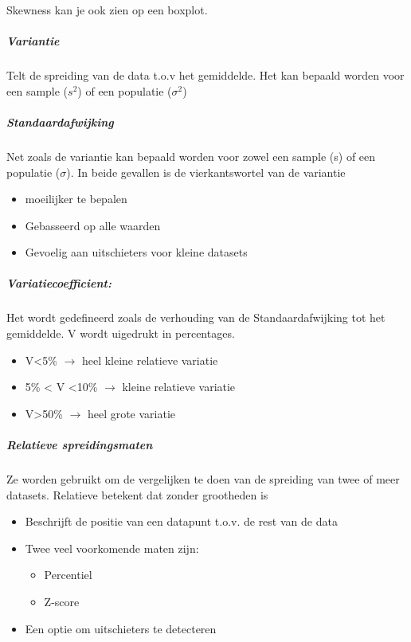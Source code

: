 \documentclass[12pt]{article}
\begin{document}
Skewness kan je ook zien op een boxplot.
\subparagraph{Variantie}
Telt de spreiding van de data t.o.v het gemiddelde. Het kan bepaald worden voor een sample ($s^2$) of een populatie ($\sigma^2$)
\subparagraph{Standaardafwijking}
Net zoals de variantie kan bepaald worden voor zowel een sample
(s) of een populatie ($\sigma$). In beide gevallen is de vierkantswortel van
de variantie
\begin{itemize}
    \item moeilijker te bepalen 
    \item Gebasseerd op alle waarden 
    \item Gevoelig aan uitschieters voor kleine datasets
\end{itemize}
\subparagraph{Variatiecoefficient:}
Het wordt gedefineerd zoals de verhouding van de Standaardafwijking tot het gemiddelde. V wordt uigedrukt in percentages.\begin{itemize}
    \item V<5\% $\rightarrow$ heel kleine relatieve variatie 
    \item 5\% < V <10\% $\rightarrow$ kleine relatieve variatie 
    \item V>50\% $\rightarrow$ heel grote variatie
\end{itemize}
\subparagraph{Relatieve spreidingsmaten}
Ze worden gebruikt om de vergelijken te doen van de spreiding van twee of meer
datasets. Relatieve betekent dat zonder grootheden is \begin{itemize}
    \item Beschrijft de positie van een datapunt t.o.v. de rest van de data 
    \item Twee veel voorkomende maten zijn:\begin{itemize}
        \item Percentiel 
        \item Z-score 
    \end{itemize}
    \item Een optie om uitschieters te detecteren
\end{itemize}
\end{document}
